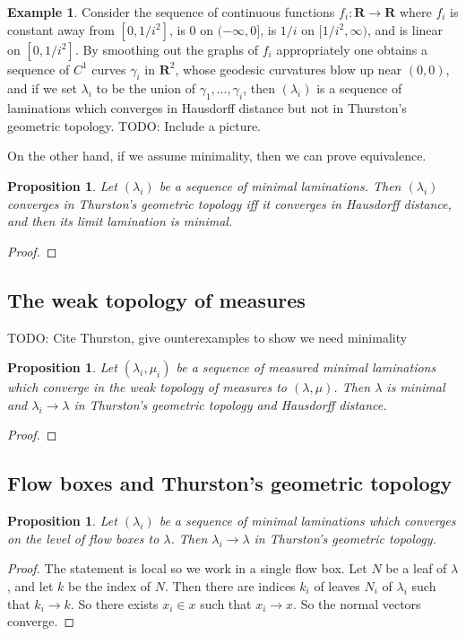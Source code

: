 \documentclass[reqno,10pt]{amsart}
\newcommand{\RR}{\mathbf{R}}
\newtheorem{proposition}[theorem]{Proposition}
\theoremstyle{definition}
\newtheorem{example}[theorem]{Example}
\numberwithin{equation}{section}
\begin{document}
\begin{example}\label{Hausdorff does not imply Thurston}
Consider the sequence of continuous functions $f_i: \RR \to \RR$ where $f_i$ is constant away from $[0, 1/i^2]$, is $0$ on $(-\infty, 0]$, is $1/i$ on $[1/i^2, \infty)$, and is linear on $[0, 1/i^2]$.
By smoothing out the graphs of $f_i$ appropriately one obtains a sequence of $C^1$ curves $\gamma_i$ in $\RR^2$, whose geodesic curvatures blow up near $(0, 0)$, and if we set $\lambda_i$ to be the union of $\gamma_1, \dots, \gamma_i$, then $(\lambda_i)$ is a sequence of laminations which converges in Hausdorff distance but not in Thurston's geometric topology.
TODO: Include a picture.
\end{example}

On the other hand, if we assume minimality, then we can prove equivalence.

\begin{proposition}
Let $(\lambda_i)$ be a sequence of minimal laminations.
Then $(\lambda_i)$ converges in Thurston's geometric topology iff it converges in Hausdorff distance, and then its limit lamination is minimal.
\end{proposition}
\begin{proof}

\end{proof}



\subsection{The weak topology of measures}
TODO: Cite Thurston, give ounterexamples to show we need minimality

\begin{proposition}
Let $(\lambda_i, \mu_i)$ be a sequence of measured minimal laminations which converge in the weak topology of measures to $(\lambda, \mu)$.
Then $\lambda$ is minimal and $\lambda_i \to \lambda$ in Thurston's geometric topology and Hausdorff distance.
\end{proposition}
\begin{proof}

\end{proof}


\subsection{Flow boxes and Thurston's geometric topology}
\begin{proposition}
Let $(\lambda_i)$ be a sequence of minimal laminations which converges on the level of flow boxes to $\lambda$.
Then $\lambda_i \to \lambda$ in Thurston's geometric topology.
\end{proposition}
\begin{proof}
The statement is local so we work in a single flow box.
Let $N$ be a leaf of $\lambda$, and let $k$ be the index of $N$.
Then there are indices $k_i$ of leaves $N_i$ of $\lambda_i$ such that $k_i \to k$.
So there exists $x_i \in x$ such that $x_i \to x$.
So the normal vectors converge.
\end{proof}
\end{document}
